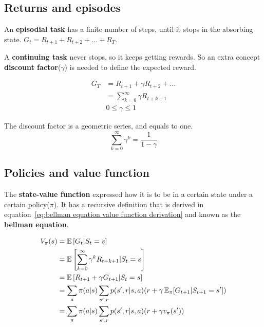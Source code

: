 \subsection{Returns and episodes}
An \textbf{episodial task} has a finite number of steps, until it stops in the absorbing state. $G_t = R_{t+1} + R_{t+2} + ... + R_{T}$.

A \textbf{continuing task} never stops, so it keeps getting rewards. So an extra concept \textbf{discount factor}($\gamma$) is needed to define the expected reward.  

\begin{equation}
\begin{split}
G_T & = R_{t+1} + \gamma R_{t+2} + ... \\
& = \sum_{k=0}^{\infty}\gamma R_{t+k+1} \\
& 0 \leq \gamma \leq 1
\end{split}
\label{eq:expected return continuing task}
\end{equation}

The discount factor is a geometric series, and equals to one.
\begin{equation}
\sum_{k=0}^{\infty} \gamma ^k = \frac{1}{1-\gamma}
\label{eq:discount factor geometry series}
\end{equation}

\subsection{Policies and value function}
The \textbf{state-value function} expressed how it is to be in a certain state under a certain policy($\pi$). It has a recursive definition that is derived in equation~\ref{eq:bellman equation value function derivation} and known as the \textbf{bellman equation}.

\begin{equation}
\begin{split}
V_{\pi}(s) & = \operatorname{\mathbb{E}}\left[G_t | S_t = s\right]\\
& = \operatorname{\mathbb{E}}\left[\sum_{k=0}^\infty \gamma^k R_{t + k + 1} | S_t = s\right]\\
& = \operatorname{\mathbb{E}}\left[R_{t+1} + \gamma G_{t+1} | S_t = s \right]\\
& = \sum_a \pi(a|s)\sum_{s',r} p(s', r|s,a)( r + \gamma \operatorname{\mathbb{E}}_\pi[G_{t+1}|S_{t+1}=s']) \\
& = \sum_a \pi(a|s)\sum_{s',r} p(s', r|s,a)( r + \gamma v_\pi(s'))
\end{split}
\label{eq:bellman equation value function derivation}
\end{equation}


